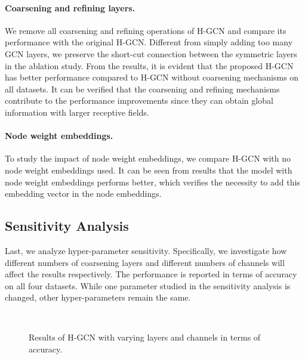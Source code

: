 \documentclass{article}
\begin{document}
\paragraph{Coarsening and refining layers.}
We remove all coarsening and refining operations of H-GCN and compare its performance with the original H-GCN. Different from simply adding too many GCN layers, we preserve the short-cut connection between the symmetric layers in the ablation study. From the results, it is evident that the proposed H-GCN has better performance compared to H-GCN without coarsening mechanisms on all datasets. It can be verified that the coarsening and refining mechanisms contribute to the performance improvements since they can obtain global information with larger receptive fields.

\paragraph{Node weight embeddings.}
To study the impact of node weight embeddings, we compare H-GCN with no node weight embeddings used. It can be seen from results that the model with node weight embeddings performs better, which verifies the necessity to add this embedding vector in the node embeddings.

\subsection{Sensitivity Analysis}

Last, we analyze hyper-parameter sensitivity. Specifically, we investigate how different numbers of coarsening layers and different numbers of channels will affect the results respectively. The performance is reported in terms of accuracy on all four datasets. While one parameter studied in the sensitivity analysis is changed, other hyper-parameters remain the same.

\begin{figure}
	\centering
	\\
	\caption{Results of H-GCN with varying layers and channels in terms of accuracy.}
\end{figure}
\end{document}
